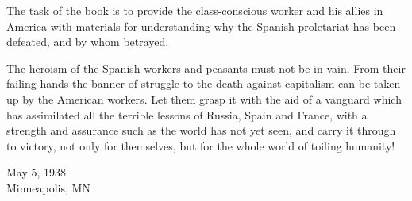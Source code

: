 The task of the book is to provide the class-conscious worker and his allies in America with materials for understanding why the Spanish proletariat has been defeated, and by whom betrayed.

The heroism of the Spanish workers and peasants must not be in vain. From their failing hands the banner of struggle to the death against capitalism can be taken up by the American workers. Let them grasp it with the aid of a vanguard which has assimilated all the terrible lessons of Russia, Spain and France, with a strength and assurance such as the world has not yet seen, and carry it through to victory, not only for themselves, but for the whole world of toiling humanity!

\begin{flushright}
  May 5, 1938 \\
  Minneapolis, MN
\end{flushright}